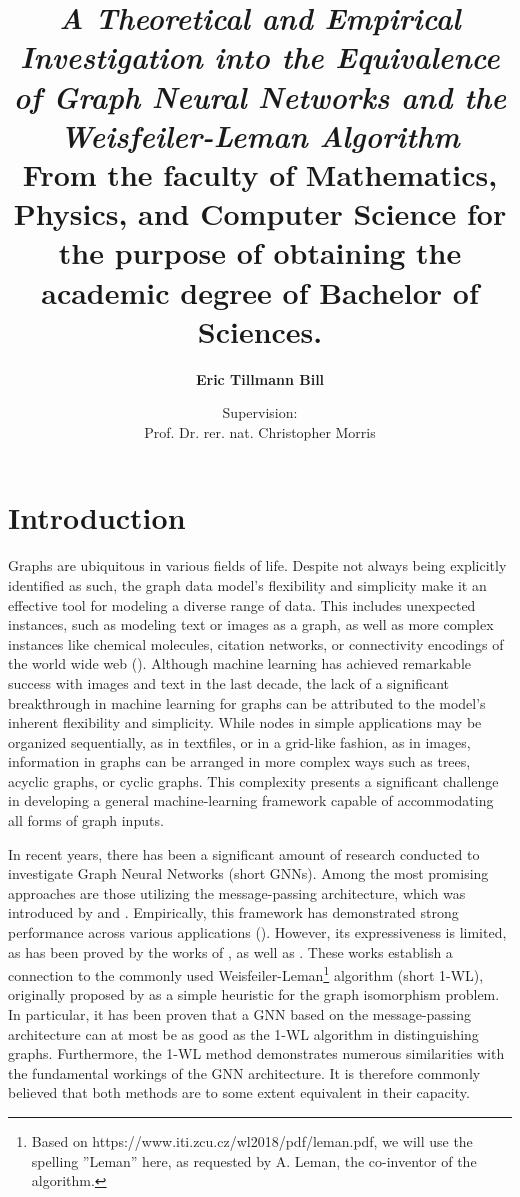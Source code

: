 \documentclass[11pt, dvipsnames, DIV=12]{scrreprt}
\title{\emph{A Theoretical and Empirical Investigation into the Equivalence of Graph Neural Networks and the Weisfeiler-Leman Algorithm}\\
\vspace{20pt}\small{\normalfont From the faculty of Mathematics, Physics, and Computer Science for the purpose of obtaining the academic degree of Bachelor of Sciences.}
}
\author{\textbf{Eric Tillmann Bill}}
\affil{\vspace{100pt}}
\author{Supervision:\\Prof. Dr. rer. nat. Christopher Morris}
\affil{Informatik 6\\RWTH Aachen University}
\date{\vspace{-30pt}}
\theoremstyle{definition}
\begin{document}
\maketitle
\tableofcontents
\newpage



\section{Introduction}
Graphs are ubiquitous in various fields of life. Despite not always being explicitly identified as such, the graph data model's flexibility and simplicity make it an effective tool for modeling a diverse range of data. This includes unexpected instances, such as modeling text or images as a graph, as well as more complex instances like chemical molecules, citation networks, or connectivity encodings of the world wide web (\cite{Mor+2020, Sca+2009}).
Although machine learning has achieved remarkable success with images and text in the last decade, the lack of a significant breakthrough in machine learning for graphs can be attributed to the model's inherent flexibility and simplicity. While nodes in simple applications may be organized sequentially, as in textfiles, or in a grid-like fashion, as in images, information in graphs can be arranged in more complex ways such as trees, acyclic graphs, or cyclic graphs. This complexity presents a significant challenge in developing a general machine-learning framework capable of accommodating all forms of graph inputs.


In recent years, there has been a significant amount of research conducted to investigate Graph Neural Networks (short GNNs). Among the most promising approaches are those utilizing the message-passing architecture, which was introduced by \cite{Gil+2017} and \cite{Sca+2009}. Empirically, this framework has demonstrated strong performance across various applications (\cite{Kip+2017, Ham+2017, Xu2018}). However, its expressiveness is limited, as has been proved by the works of \cite{Morris2018}, as well as \cite{Xu2018}. These works establish a connection to the commonly used Weisfeiler-Leman\footnote{Based on https://www.iti.zcu.cz/wl2018/pdf/leman.pdf, we will use the spelling ''Leman'' here, as requested by A. Leman, the co-inventor of the algorithm.} algorithm (short 1-WL), originally proposed by \cite{Wei+1968} as a simple heuristic for the graph isomorphism problem. In particular, it has been proven that a GNN based on the message-passing architecture can at most be as good as the 1-WL algorithm in distinguishing graphs. Furthermore, the 1-WL method demonstrates numerous similarities with the fundamental workings of the GNN architecture. It is therefore commonly believed that both methods are to some extent equivalent in their capacity.
\end{document}
